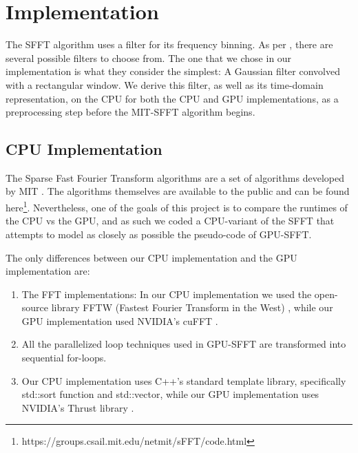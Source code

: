 
\section{Implementation}

The SFFT algorithm uses a filter for its frequency binning.
As per \cite{MIT-SFFT}, there are several possible filters to choose from. The one that we chose in our implementation is what they consider the simplest: A Gaussian filter convolved with a rectangular window. We derive this filter, as well as its time-domain representation, on the CPU for both the CPU and GPU implementations, as a preprocessing step before the MIT-SFFT algorithm begins.


\subsection{CPU Implementation}
The Sparse Fast Fourier Transform algorithms are a set of algorithms developed by MIT \cite{MIT-SFFT}.
The algorithms themselves are available to the public and can be found here\footnote{https://groups.csail.mit.edu/netmit/sFFT/code.html}.
Nevertheless, one of the goals of this project is to compare the runtimes of the CPU vs the GPU, and as such we coded a CPU-variant of the SFFT that attempts to model as closely as possible the pseudo-code of GPU-SFFT. 

The only differences between our CPU implementation and the GPU implementation are:
\begin{enumerate}
    \item The FFT implementations: In our CPU implementation we used the open-source library FFTW (Fastest Fourier Transform in the West) \cite{FFTW}, while our GPU implementation used NVIDIA's cuFFT \cite{cuFFT}.
    
    \item All the parallelized loop techniques used in GPU-SFFT are transformed into sequential for-loops.
    
    \item Our CPU implementation uses C++'s standard template library, specifically std::sort function and std::vector, while our GPU implementation uses NVIDIA's Thrust library \cite{thrust}.
\end{enumerate}
